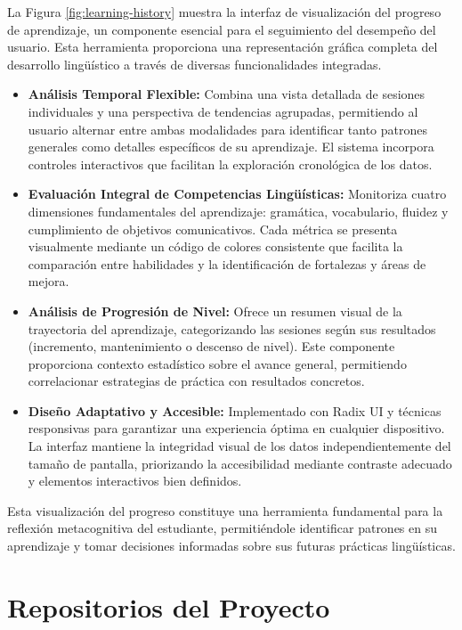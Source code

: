 La Figura \ref{fig:learning-history} muestra la interfaz de visualización del progreso de aprendizaje, un componente esencial para el seguimiento del desempeño del usuario. Esta herramienta proporciona una representación gráfica completa del desarrollo lingüístico a través de diversas funcionalidades integradas.

\begin{itemize}
    \item \textbf{Análisis Temporal Flexible:} Combina una vista detallada de sesiones individuales y una perspectiva de tendencias agrupadas, permitiendo al usuario alternar entre ambas modalidades para identificar tanto patrones generales como detalles específicos de su aprendizaje. El sistema incorpora controles interactivos que facilitan la exploración cronológica de los datos.
    
    \item \textbf{Evaluación Integral de Competencias Lingüísticas:} Monitoriza cuatro dimensiones fundamentales del aprendizaje: gramática, vocabulario, fluidez y cumplimiento de objetivos comunicativos. Cada métrica se presenta visualmente mediante un código de colores consistente que facilita la comparación entre habilidades y la identificación de fortalezas y áreas de mejora.
    
    \item \textbf{Análisis de Progresión de Nivel:} Ofrece un resumen visual de la trayectoria del aprendizaje, categorizando las sesiones según sus resultados (incremento, mantenimiento o descenso de nivel). Este componente proporciona contexto estadístico sobre el avance general, permitiendo correlacionar estrategias de práctica con resultados concretos.
    
    \item \textbf{Diseño Adaptativo y Accesible:} Implementado con Radix UI y técnicas responsivas para garantizar una experiencia óptima en cualquier dispositivo. La interfaz mantiene la integridad visual de los datos independientemente del tamaño de pantalla, priorizando la accesibilidad mediante contraste adecuado y elementos interactivos bien definidos.
\end{itemize}

Esta visualización del progreso constituye una herramienta fundamental para la reflexión metacognitiva del estudiante, permitiéndole identificar patrones en su aprendizaje y tomar decisiones informadas sobre sus futuras prácticas lingüísticas.

\section{Repositorios del Proyecto}
\label{sec:repositorios-proyecto}

